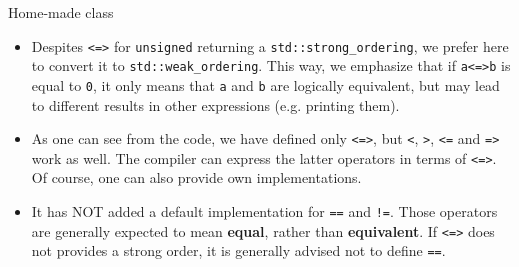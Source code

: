 \begin{frame}[fragile]
  \begin{block}{Home-made class}
    \begin{itemize}
      \item Despites \texttt{<=>} for \texttt{unsigned} returning a \texttt{std::strong_ordering}, we prefer here to convert it to \texttt{std::weak_ordering}. This way, we emphasize that if \texttt{a<=>b} is equal to \texttt{0}, it only means that \texttt{a} and \texttt{b} are logically equivalent, but may lead to different results in other expressions (e.g. printing them).
      \item As one can see from the code, we have defined only \texttt{<=>}, but \texttt{<}, \texttt{>}, \texttt{<=} and \texttt{=>} work as well. The compiler can express the latter operators in terms of \texttt{<=>}. Of course, one can also provide own implementations.
      \item It has NOT added a default implementation for \texttt{==} and \texttt{!=}. Those operators are generally expected to mean \textbf{equal}, rather than \textbf{equivalent}. If \texttt{<=>} does not provides a strong order, it is generally advised not to define \texttt{==}.
    \end{itemize}
  \end{block}
\end{frame}

